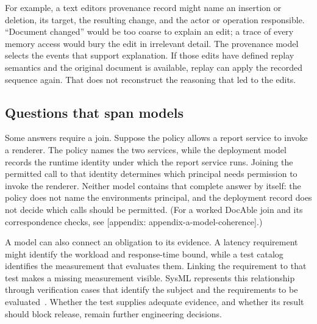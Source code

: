 
For example, a text editor\textquotesingle s provenance record might name an insertion or deletion, its target, the resulting change, and the actor or operation responsible. ``Document changed'' would be too coarse to explain an edit; a trace of every memory access would bury the edit in irrelevant detail. The provenance model selects the events that support explanation. If those edits have defined replay semantics and the original document is available, replay can apply the recorded sequence again. That does not reconstruct the reasoning that led to the edits.

\subsection{Questions that span models}\label{heading:questions-that-span-models}


Some answers require a join. Suppose the policy allows a report service to invoke a renderer. The policy names the two services, while the deployment model records the runtime identity under which the report service runs. Joining the permitted call to that identity determines which principal needs permission to invoke the renderer. Neither model contains that complete answer by itself: the policy does not name the environment\textquotesingle s principal, and the deployment record does not decide which calls should be permitted. (For a worked DocAble join and its correspondence checks, see {[}appendix: appendix-a-model-coherence{]}.)

A model can also connect an obligation to its evidence. A latency requirement might identify the workload and response-time bound, while a test catalog identifies the measurement that evaluates them. Linking the requirement to that test makes a missing measurement visible. SysML represents this relationship through verification cases that identify the subject and the requirements to be evaluated~\citep{omg2025sysml}. Whether the test supplies adequate evidence, and whether its result should block release, remain further engineering decisions.


